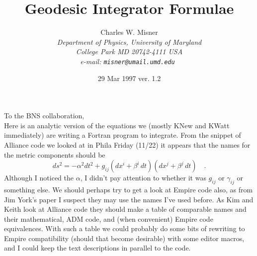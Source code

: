 \def\half{\mbox{$\frac{1}{2}$}}     %



\makeatletter
{}
\makeatother
\renewcommand{\theequation}{\thesection.\arabic{equation}}

\def\x{{\bf x}}
\def\z{{\bf z}}

\newcommand{\avg}[1]{\langle #1 \rangle}


%
\title{Geodesic Integrator Formulae
      }
%
\author{   \sc
            Charles W. Misner\\
           \em
            Department of Physics, University of Maryland%
           \\ \em
            College Park MD 20742-4111 USA\\
           \rm
         e-mail: \tt misner@umail.umd.edu
        }
\date{29 Mar 1997 \qquad   ver. 1.2}
%
\maketitle



\section*{}
    To the BNS collaboration,\\[1.2ex]
    Here is an analytic version of the equations we (mostly KNew and
KWatt immediately) are writing a Fortran program to integrate.
    From the snippet of Alliance code we looked at in Phila Friday
(11/22) it appears that the names for the metric components should be
    \begin{equation}\label{eq-ds2}
    ds^2 = - \alpha^2 dt^2 + g_{ij} (dx^i + \beta^i\,dt)(dx^j +
\beta^j\,dt) \quad .
    \end{equation}
    Although I noticed the $\alpha$, I didn't pay attention to
whether it was $g_{ij}$ or $\gamma_{ij}$ or something else.
    We should perhaps try to get a look at Empire code also, as from
Jim York's paper I suspect they may use the names I've used before.
    As Kim and Keith look at Alliance code they should make a table
of comparable names and their mathematical, ADM code, and (when
convenient) Empire code equivalences.
    With such a table we could probably do some bits of rewriting to
Empire compatibility (should that become desirable) with some editor
macros, and I could keep the text descriptions in parallel to the
code.

